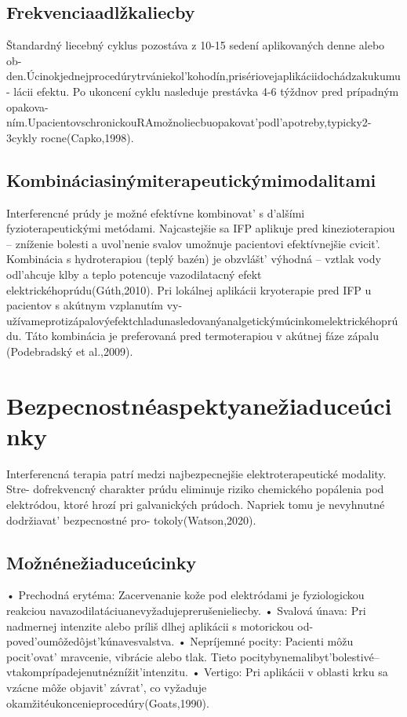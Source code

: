 \subsection{Frekvenciaadlžkaliecby}

Štandardný liecebný cyklus pozostáva z 10-15 sedení aplikovaných denne alebo ob- den.Úcinokjednejprocedúrytrvániekol’kohodín,prisériovejaplikáciidochádzakukumu- lácii efektu. Po ukoncení cyklu nasleduje prestávka 4-6 týždnov pred prípadným opakova- ním.UpacientovschronickouRAmožnoliecbuopakovat’podl’apotreby,typicky2-3cykly rocne(Capko,1998).


\subsection{Kombináciasinýmiterapeutickýmimodalitami}

Interferencné prúdy je možné efektívne kombinovat’ s d’alšími fyzioterapeutickými metódami. Najcastejšie sa IFP aplikuje pred kinezioterapiou -- zníženie bolesti a uvol’nenie svalov umožnuje pacientovi efektívnejšie cvicit’. Kombinácia s hydroterapiou (teplý bazén) je obzvlášt’ výhodná -- vztlak vody odl’ahcuje klby a teplo potencuje vazodilatacný efekt elektrickéhoprúdu(Gúth,2010). Pri lokálnej aplikácii kryoterapie pred IFP u pacientov s akútnym vzplanutím vy- užívameprotizápalovýefektchladunasledovanýanalgetickýmúcinkomelektrickéhoprúdu. Táto kombinácia je preferovaná pred termoterapiou v akútnej fáze zápalu (Podebradský et al.,2009).


\section{Bezpecnostnéaspektyanežiaduceúcinky}

Interferencná terapia patrí medzi najbezpecnejšie elektroterapeutické modality. Stre- dofrekvencný charakter prúdu eliminuje riziko chemického popálenia pod elektródou, ktoré hrozí pri galvanických prúdoch. Napriek tomu je nevyhnutné dodržiavat’ bezpecnostné pro- tokoly(Watson,2020).


\subsection{Možnénežiaduceúcinky}

• Prechodná erytéma: Zacervenanie kože pod elektródami je fyziologickou reakciou navazodilatáciuanevyžadujeprerušenieliecby. • Svalová únava: Pri nadmernej intenzite alebo príliš dlhej aplikácii s motorickou od- poved’oumôžedôjst’kúnavesvalstva. • Nepríjemné pocity: Pacienti môžu pocit’ovat’ mravcenie, vibrácie alebo tlak. Tieto pocitybynemalibyt’bolestivé--vtakomprípadejenutnéznížit’intenzitu. • Vertigo: Pri aplikácii v oblasti krku sa vzácne môže objavit’ závrat’, co vyžaduje okamžitéukoncenieprocedúry(Goats,1990).


